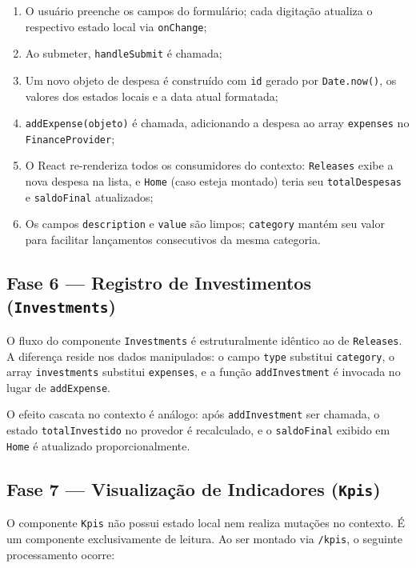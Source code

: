 \documentclass{article}
\begin{document}
\begin{enumerate}
  \item O usuário preenche os campos do formulário; cada digitação atualiza o respectivo estado local via \texttt{onChange};
  \item Ao submeter, \texttt{handleSubmit} é chamada;
  \item Um novo objeto de despesa é construído com \texttt{id} gerado por \texttt{Date.now()}, os valores dos estados locais e a data atual formatada;
  \item \texttt{addExpense(objeto)} é chamada, adicionando a despesa ao array \texttt{expenses} no \texttt{FinanceProvider};
  \item O React re-renderiza todos os consumidores do contexto: \texttt{Releases} exibe a nova despesa na lista, e \texttt{Home} (caso esteja montado) teria seu \texttt{totalDespesas} e \texttt{saldoFinal} atualizados;
  \item Os campos \texttt{description} e \texttt{value} são limpos; \texttt{category} mantém seu valor para facilitar lançamentos consecutivos da mesma categoria.
\end{enumerate}

\subsection{Fase 6 — Registro de Investimentos (\texttt{Investments})}

O fluxo do componente \texttt{Investments} é estruturalmente idêntico ao de \texttt{Releases}. A diferença reside nos dados manipulados: o campo \texttt{type} substitui \texttt{category}, o array \texttt{investments} substitui \texttt{expenses}, e a função \texttt{addInvestment} é invocada no lugar de \texttt{addExpense}.

O efeito cascata no contexto é análogo: após \texttt{addInvestment} ser chamada, o estado \texttt{totalInvestido} no provedor é recalculado, e o \texttt{saldoFinal} exibido em \texttt{Home} é atualizado proporcionalmente.

\subsection{Fase 7 — Visualização de Indicadores (\texttt{Kpis})}

O componente \texttt{Kpis} não possui estado local nem realiza mutações no contexto. É um componente exclusivamente de leitura. Ao ser montado via \texttt{/kpis}, o seguinte processamento ocorre:
\end{document}
